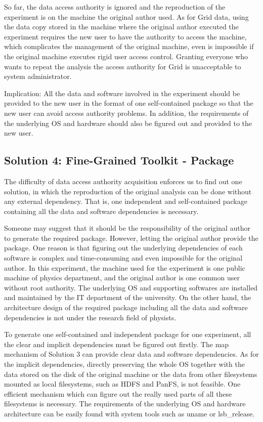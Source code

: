 \documentclass{acm_proc_article-sp}
\begin{document}
So far, the data access authority is ignored and
the reproduction of the experiment is on the machine the original author used. 
As for Grid data, using the data
copy stored in the machine where the original author executed the experiment requires the
new user to have the authority to access the machine, which complicates the
management of the original machine, even is impossible if the original machine
executes rigid user access control. Granting everyone who wants to repeat the
analysis the access authority for Grid is unacceptable to system administrator. 

Implication: All the data and software involved in the experiment should be
provided to the new user in the format of one self-contained package so that
the new user can avoid 
access authority problems.
In addition, the requirements of the underlying
OS and hardware should also be figured out and provided to the new user.

\subsection{Solution 4: Fine-Grained Toolkit - Package}
The difficulty of data access authority acquisition enforces us to find out one
solution, in which the reproduction of the original analysis can be done
without any external dependency. That is, one independent and self-contained
package containing all the data and software dependencies is necessary. 

Someone may suggest that it should be the responsibility of the original author
to generate the required package. However, letting the original author provide
the package. 
One reason is that figuring out the underlying dependencies of
each software is complex and time-consuming and even impossible for the
original author. In this experiment, the machine used for the experiment is one
public machine of physics department, and the original author is one common user without
root authority. The underlying OS and supporting softwares are installed and
maintained by the IT department of the university. On the other hand, the
architecture design of the required package including all the data and software
dependencies is not under the research field of physists.

To generate one self-contained and independent package for one experiment, all
the clear and implicit dependencies must be figured out firstly. The map mechanism
of Solution 3 can provide clear data and software dependencies. As for the
implicit dependencies, directly preserving the whole OS together with the data
stored on the disk of the original machine or the data from other filesystems
mounted as local filesystems, such as HDFS and PanFS, is not feasible. One
efficient mechanism which can figure out the really used parts of all these
filesystems is necessary. The requirements of the underlying OS and hardware
architecture can be easily found with system tools such as uname or
lsb\_release.
\end{document}
